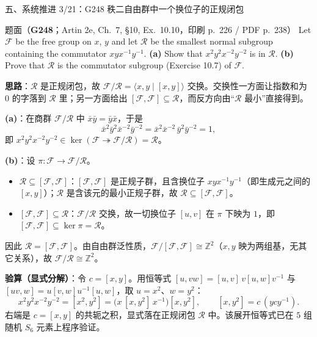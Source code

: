 \documentclass[aspectratio=169,10pt,fontset=none]{ctexbeamer}
\newcommand{\ex}[1]{\textcolor{accent}{\footnotesize\bfseries #1}}
\newcommand{\key}[1]{\textcolor{ink}{\bfseries #1}}
\begin{document}
\begin{frame}[t]{五、系统推进 3/21：G248 秩二自由群中一个换位子的正规闭包}
\label{ex:G248}
\scriptsize
\begin{block}{\footnotesize 题面（\ex{G248}；Artin 2e, Ch.~7, §10, Ex.~10.10，印刷 p.~226 / PDF p.~238）}
Let $\mathcal F$ be the free group on $x$, $y$ and let $\mathcal R$ be the smallest normal subgroup containing the commutator $xyx^{-1}y^{-1}$.
\textbf{(a)} Show that $x^2y^2x^{-2}y^{-2}$ is in $\mathcal R$.
\textbf{(b)} Prove that $\mathcal R$ is the commutator subgroup (Exercise 10.7) of $\mathcal F$.
\end{block}
\key{思路}：$\mathcal R$ 是正规闭包，故 $\mathcal F/\mathcal R=\langle x,y\mid [x,y]\rangle$ 交换。交换性一方面让指数和为 $0$ 的字落到 $\mathcal R$ 里；另一方面给出 $[\mathcal F,\mathcal F]\subseteq\mathcal R$，而反方向由“$\mathcal R$ 最小”直接得到。

\key{(a)}：在商群 $\mathcal F/\mathcal R$ 中 $\bar x\bar y=\bar y\bar x$，于是
\[ \bar x^2\bar y^2\bar x^{-2}\bar y^{-2}=\bar x^2\bar x^{-2}\,\bar y^2\bar y^{-2}=1, \]
即 $x^2y^2x^{-2}y^{-2}\in\ker(\mathcal F\twoheadrightarrow\mathcal F/\mathcal R)=\mathcal R$。

\key{(b)}：设 $\pi:\mathcal F\to\mathcal F/\mathcal R$。
\begin{itemize}
\item $\mathcal R\subseteq[\mathcal F,\mathcal F]$：$[\mathcal F,\mathcal F]$ 是正规子群，且含换位子 $xyx^{-1}y^{-1}$（即生成元之间的 $[x,y]$）；$\mathcal R$ 是含该元的最小正规子群，故 $\mathcal R\subseteq[\mathcal F,\mathcal F]$。
\item $[\mathcal F,\mathcal F]\subseteq\mathcal R$：$\mathcal F/\mathcal R$ 交换，故一切换位子 $[u,v]$ 在 $\pi$ 下映为 $1$，即 $[\mathcal F,\mathcal F]\subseteq\ker\pi=\mathcal R$。
\end{itemize}
因此 $\mathcal R=[\mathcal F,\mathcal F]$。由自由群泛性质，$\mathcal F/[\mathcal F,\mathcal F]\cong\mathbb Z^2$（$x,y$ 映为两组基，无其它关系），故 $\mathcal F/\mathcal R\cong\mathbb Z^2$。

\key{验算（显式分解）}：令 $c=[x,y]$。用恒等式 $[u,vw]=[u,v]\,v[u,w]v^{-1}$ 与 $[uv,w]=u[v,w]u^{-1}[u,w]$，取 $u=x^2$、$w=y^2$：
\[ x^2y^2x^{-2}y^{-2}=[x^2,y^2]=\bigl(x\,[x,y^2]\,x^{-1}\bigr)[x,y^2],\qquad [x,y^2]=c\,(ycy^{-1}). \]
右端是 $c=[x,y]$ 的共轭之积，显式落在正规闭包 $\mathcal R$ 中。该展开恒等式已在 $5$ 组随机 $S_6$ 元素上程序验证。
\end{frame}
\end{document}
